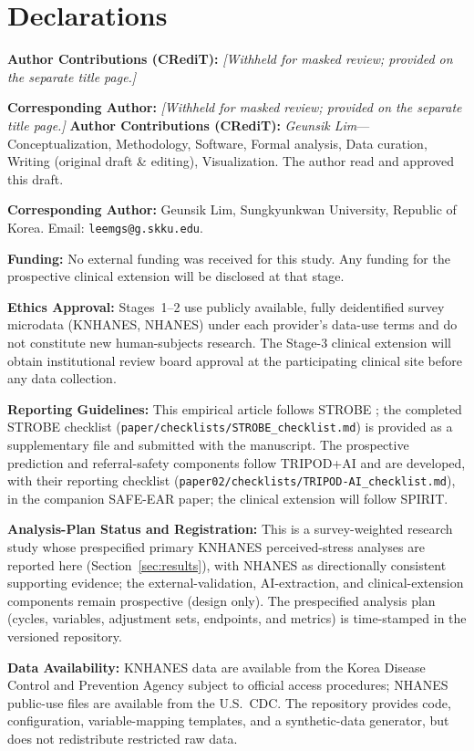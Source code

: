 \section*{Declarations}
\ifblind
\textbf{Author Contributions (CRediT):} \emph{[Withheld for masked review; provided on the separate title page.]}

\textbf{Corresponding Author:} \emph{[Withheld for masked review; provided on the separate title page.]}
\else
\textbf{Author Contributions (CRediT):} \emph{Geunsik Lim}---Conceptualization, Methodology, Software, Formal analysis, Data curation, Writing (original draft \& editing), Visualization. The author read and approved this draft.

\textbf{Corresponding Author:} Geunsik Lim, Sungkyunkwan University, Republic of Korea. Email: \texttt{leemgs@g.skku.edu}.
\fi

\textbf{Funding:} No external funding was received for this study. Any funding for the prospective clinical extension will be disclosed at that stage.

\textbf{Ethics Approval:} Stages~1--2 use publicly available, fully deidentified survey microdata (KNHANES, NHANES) under each provider's data-use terms and do not constitute new human-subjects research. The Stage-3 clinical extension will obtain institutional review board approval at the participating clinical site before any data collection.

\textbf{Reporting Guidelines:} This empirical article follows STROBE \citep{vonelm2007strobe}; the completed STROBE checklist (\texttt{paper/checklists/STROBE\_checklist.md}) is provided as a supplementary file and submitted with the manuscript. The prospective prediction and referral-safety components follow TRIPOD+AI \citep{collins2024tripodai} and are developed, with their reporting checklist (\texttt{paper02/checklists/TRIPOD-AI\_checklist.md}), in the companion SAFE-EAR paper; the clinical extension will follow SPIRIT.

\textbf{Analysis-Plan Status and Registration:} This is a survey-weighted research study whose prespecified primary KNHANES perceived-stress analyses are reported here (Section~\ref{sec:results}), with NHANES as directionally consistent supporting evidence; the external-validation, AI-extraction, and clinical-extension components remain prospective (design only). The prespecified analysis plan (cycles, variables, adjustment sets, endpoints, and metrics) is time-stamped in the versioned repository.

\textbf{Data Availability:} KNHANES data are available from the Korea Disease Control and Prevention Agency subject to official access procedures; NHANES public-use files are available from the U.S.\ CDC. The repository provides code, configuration, variable-mapping templates, and a synthetic-data generator, but does not redistribute restricted raw data.


